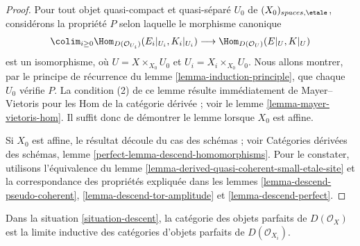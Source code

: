 \begin{proof}
Pour tout objet quasi-compact et quasi-s\'epar\'e $U_0$ de
$(X_0)_{spaces,\etale}$, consid\'erons la propri\'et\'e $P$ selon laquelle le
morphisme canonique
$$
\colim_{i \geq 0} \Hom_{D(\mathcal{O}_{U_i})}(E_i|_{U_i}, K_i|_{U_i})
\longrightarrow
\Hom_{D(\mathcal{O}_U)}(E|_U, K|_U)
$$
est un isomorphisme, o\`u $U=X\times_{X_0}U_0$ et
$U_i=X_i\times_{X_0}U_0$. Nous allons montrer, par le principe de r\'ecurrence
du lemme \ref{lemma-induction-principle}, que chaque $U_0$ v\'erifie $P$.
La condition (2) de ce lemme r\'esulte imm\'ediatement de Mayer--Vietoris pour
les Hom de la cat\'egorie d\'eriv\'ee ; voir le lemme
\ref{lemma-mayer-vietoris-hom}. Il suffit donc de d\'emontrer le lemme lorsque
$X_0$ est affine.

\medskip\noindent
Si $X_0$ est affine, le r\'esultat d\'ecoule du cas des sch\'emas ; voir
Cat\'egories d\'eriv\'ees des sch\'emas, lemme
\ref{perfect-lemma-descend-homomorphisms}. Pour le constater, utilisons
l'\'equivalence du lemme \ref{lemma-derived-quasi-coherent-small-etale-site}
et la correspondance des propri\'et\'es expliqu\'ee dans les lemmes
\ref{lemma-descend-pseudo-coherent},
\ref{lemma-descend-tor-amplitude} et
\ref{lemma-descend-perfect}.
\end{proof}

\begin{lemma}
\label{lemma-perfect-on-limit}
Dans la situation \ref{situation-descent}, la cat\'egorie des objets parfaits
de $D(\mathcal{O}_X)$ est la limite inductive des cat\'egories d'objets
parfaits de $D(\mathcal{O}_{X_i})$.
\end{lemma}

